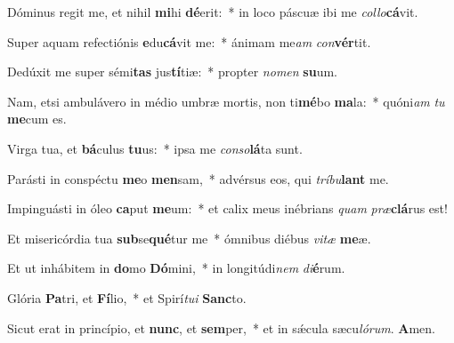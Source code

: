 \item Dóminus regit me, et nihil \textbf{mi}hi \textbf{dé}erit:~* in loco páscuæ ibi me \textit{col}\textit{lo}\textbf{cá}vit.
\item Super aquam refectiónis \textbf{e}du\textbf{cá}vit me:~* ánimam me\textit{am} \textit{con}\textbf{vér}tit.
\item Dedúxit me super sémi\textbf{tas} jus\textbf{tí}tiæ:~* propter \textit{no}\textit{men} \textbf{su}um.
\item Nam, etsi ambulávero in médio umbræ mortis, non ti\textbf{mé}bo \textbf{ma}la:~* quóni\textit{am} \textit{tu} \textbf{me}cum es.
\item Virga tua, et \textbf{bá}culus \textbf{tu}us:~* ipsa me \textit{con}\textit{so}\textbf{lá}ta sunt.
\item Parásti in conspéctu \textbf{me}o \textbf{men}sam,~* advérsus eos, qui \textit{trí}\textit{bu}\textbf{lant} me.
\item Impinguásti in óleo \textbf{ca}put \textbf{me}um:~* et calix meus inébrians \textit{quam} \textit{præ}\textbf{clá}rus est!
\item Et misericórdia tua \textbf{sub}se\textbf{qué}tur me~* ómnibus diébus \textit{vi}\textit{tæ} \textbf{me}æ.
\item Et ut inhábitem in \textbf{do}mo \textbf{Dó}mini,~* in longitúdi\textit{nem} \textit{di}\textbf{é}rum.
\item Glória \textbf{Pa}tri, et \textbf{Fí}lio,~* et Spirí\textit{tu}\textit{i} \textbf{Sanc}to.
\item Sicut erat in princípio, et \textbf{nunc}, et \textbf{sem}per,~* et in sǽcula sæcu\textit{ló}\textit{rum}. \textbf{A}men.

